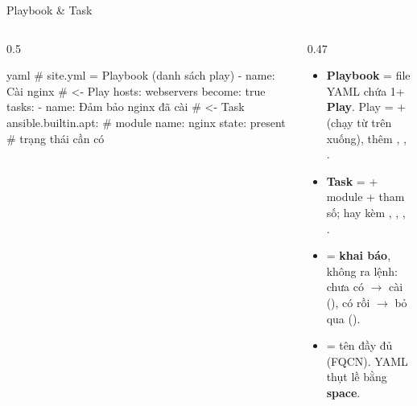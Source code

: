 \documentclass[aspectratio=169,11pt,xcolor=table]{beamer}
\begin{document}
\begin{frame}[fragile]{Playbook \& Task}
  \begin{columns}[c]
    \begin{column}{0.5\textwidth}
\begin{codeblock}[minted options={fontsize=\scriptsize}]{yaml}
# site.yml = Playbook (danh sách play)
- name: Cài nginx          # <- Play
  hosts: webservers
  become: true
  tasks:
    - name: Đảm bảo nginx đã cài  # <- Task
      ansible.builtin.apt:        # module
        name: nginx
        state: present    # trạng thái cần có
\end{codeblock}
    \end{column}
    \begin{column}{0.47\textwidth}
      \begin{itemize}\small\setlength{\itemsep}{0.22cm}
        \item \textbf{Playbook} = file YAML chứa 1+ \textbf{Play}.
              Play =  +  (chạy từ trên xuống),
              thêm , , .
        \item \textbf{Task} =  + module + tham số; hay kèm
              , , , .
        \item {} = \textbf{khai báo}, không ra lệnh:
              chưa có $\rightarrow$ cài (), có rồi $\rightarrow$ bỏ qua ().
        \item {} = tên đầy đủ (FQCN). YAML thụt lề bằng \textbf{space}.
      \end{itemize}
    \end{column}
  \end{columns}
\end{frame}
\end{document}

